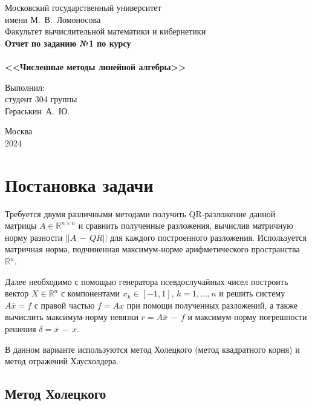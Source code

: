 \documentclass[a4paper,12pt,titlepage,finall]{article}
\begin{document}
\begin{titlepage}
    \begin{center}
	{\small \sc Московский государственный университет \\имени М.~В.~Ломоносова\\
	Факультет вычислительной математики и кибернетики\\}
	\vfill
	{\Large \bf Отчет по заданию №1 по курсу}\\
	~\\
	{\Large \bf <<Численные методы линейной алгебры>>}\\ 
    \end{center}
    \begin{flushright}
	\vfill {Выполнил:\\
	студент 304 группы\\
	Гераськин~А.~Ю.}
    \end{flushright}
    \begin{center}
	\vfill
	{\small Москва\\2024}
    \end{center}
\end{titlepage}

\tableofcontents
\newpage

\section{Постановка задачи}

Требуется двумя различными методами получить QR-разложение данной матрицы $A \in \mathbb{R}^{n \times n}$ и сравнить полученные разложения, вычислив матричную норму разности $||A \, - \, QR||$ для каждого построенного разложения. Используется матричная норма, подчиненная максимум-норме арифметического пространства $\mathbb{R}^{n}$.

Далее необходимо с помощью генератора псевдослучайных чисел построить вектор $X \in \mathbb{R}^{n}$ с компонентами $x_k \in [-1,1], \, k = 1, \ldots, n$ и решить систему $A\overline{x} = f$ с правой частью $f = Ax$ при помощи полученных разложений, а также вычислить максимум-норму невязки $\displaystyle r = A\overline{x}\, - \,f$ и максимум-норму погрешности решения $\displaystyle \delta = \overline{x}\,-\,x$.

В данном варианте используются метод Холецкого (метод квадратного корня) и метод отражений Хаусхолдера.

\subsection{Метод Холецкого}
\end{document}
